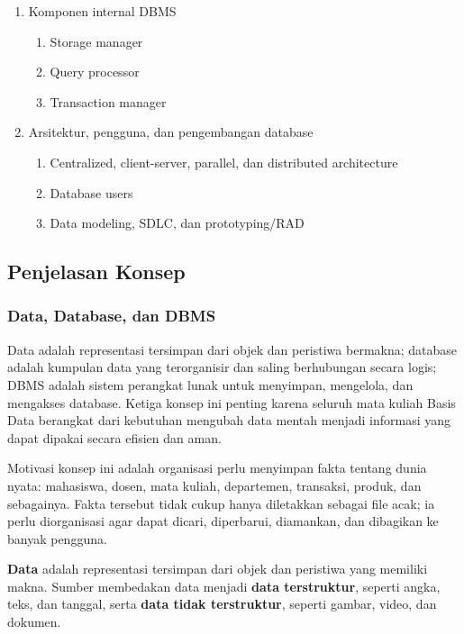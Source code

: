 \begin{enumerate}
    \item \pwajib Komponen internal DBMS
    \begin{enumerate}
        \item \pwajib Storage manager
        \item \pwajib Query processor
        \item \pwajib Transaction manager
    \end{enumerate}
    \item \ppaham Arsitektur, pengguna, dan pengembangan database
    \begin{enumerate}
        \item \ppaham Centralized, client-server, parallel, dan distributed architecture
        \item \ppaham Database users
        \item \ppaham Data modeling, SDLC, dan prototyping/RAD
    \end{enumerate}
\end{enumerate}

\subsection{Penjelasan Konsep}

\subsubsection{Data, Database, dan DBMS}

\begin{jawab}
Data adalah representasi tersimpan dari objek dan peristiwa bermakna; database adalah kumpulan data yang terorganisir dan saling berhubungan secara logis; DBMS adalah sistem perangkat lunak untuk menyimpan, mengelola, dan mengakses database. Ketiga konsep ini penting karena seluruh mata kuliah Basis Data berangkat dari kebutuhan mengubah data mentah menjadi informasi yang dapat dipakai secara efisien dan aman.
\end{jawab}

Motivasi konsep ini adalah organisasi perlu menyimpan fakta tentang dunia nyata: mahasiswa, dosen, mata kuliah, departemen, transaksi, produk, dan sebagainya. Fakta tersebut tidak cukup hanya diletakkan sebagai file acak; ia perlu diorganisasi agar dapat dicari, diperbarui, diamankan, dan dibagikan ke banyak pengguna.

\textbf{Data} adalah representasi tersimpan dari objek dan peristiwa yang memiliki makna. Sumber membedakan data menjadi \textbf{data terstruktur}, seperti angka, teks, dan tanggal, serta \textbf{data tidak terstruktur}, seperti gambar, video, dan dokumen.

